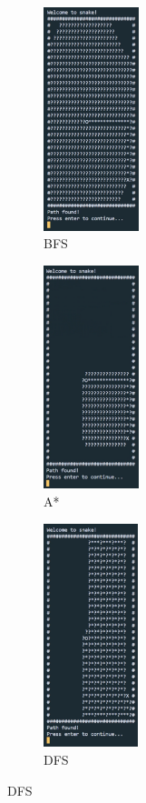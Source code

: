 \documentclass[11pt]{article}
\begin{document}
\begin{figure}[H]
\centering
\begin{subfigure}{0.24\textwidth}
    \centering
    \includegraphics[height=6.5cm]{BFS_Path_found} 
    \caption{BFS}
    \label{fig:subim4}
\end{subfigure}
\begin{subfigure}{0.24\textwidth}
    \centering
    \includegraphics[height=6.5cm]{A_Star_Path_Found}
    \caption{A*}
    \label{fig:subim5}
\end{subfigure}
\begin{subfigure}{0.24\textwidth}
    \centering
    \includegraphics[height=6.5cm]{DFS_Path_Found}
    \caption{DFS}

\end{subfigure}
\end{figure}
\end{document}
